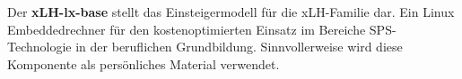 
Der \textbf{xLH-lx-base} stellt das Einsteigermodell für die xLH-Familie dar.
Ein Linux Embeddedrechner für den kostenoptimierten Einsatz im Bereiche SPS-Technologie in der beruflichen Grundbildung.
Sinnvollerweise wird diese Komponente als persönliches Material verwendet.
